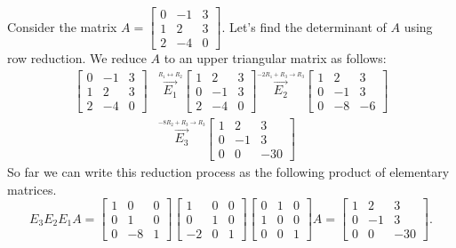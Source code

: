 \begin{example}
Consider the matrix $A=
\begin{bmatrix}
0&-1&3\\
1&2&3\\
2&-4&0
\end{bmatrix}
$.  
Let's find the determinant of $A$ using row reduction.
We reduce $A$ to an upper triangular matrix as follows:
\begin{align*}
\begin{bmatrix}
0&-1&3\\
1&2&3\\
2&-4&0
\end{bmatrix}
&\stackrel{\xrightarrow{R_1 \leftrightarrow R_2}}{E_1}
\begin{bmatrix}
1&2&3\\
0&-1&3\\
2&-4&0
\end{bmatrix}
\stackrel{\xrightarrow{-2R_1 + R_3\to R_3}}{E_2}
\begin{bmatrix}
 1 & 2 & 3 \\
 0 & -1 & 3 \\
 0 & -8 & -6
\end{bmatrix}\\
&\stackrel{\xrightarrow{-8R_2+R_3\to R_3}}{E_3}
\begin{bmatrix}
 1 & 2 & 3 \\
 0 & -1 & 3 \\
 0 & 0 & -30
\end{bmatrix}
\end{align*}
So far we can write this reduction process as the following product of elementary matrices.
$$E_3E_2E_1A=
\begin{bmatrix}
 1 & 0 & 0 \\
 0 & 1 & 0 \\
 0 & -8 & 1
\end{bmatrix}
\begin{bmatrix}
 1 & 0 & 0 \\
 0 & 1 & 0 \\
 -2 & 0 & 1
\end{bmatrix}
\begin{bmatrix}
 0 & 1 & 0 \\
 1 & 0 & 0 \\
 0 & 0 & 1
\end{bmatrix}
A=\begin{bmatrix}
 1 & 2 & 3 \\
 0 & -1 & 3 \\
 0 & 0 & -30
\end{bmatrix}.
$$
\end{example}
